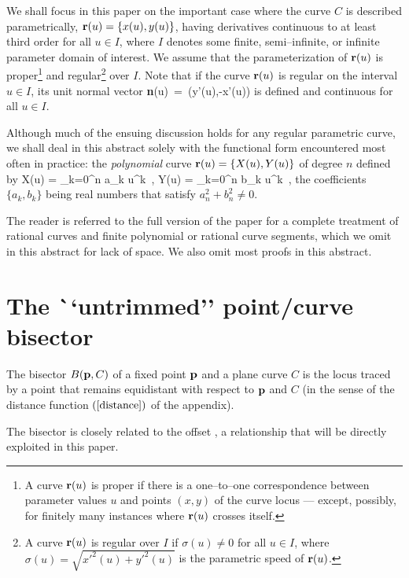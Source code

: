 We shall focus in this paper on the important case where the curve $C$
is described parametrically, ${\bf r}(u)=\{x(u),y(u)\}$, having
derivatives
continuous to at least third order for all $u \in I$, where $I$
denotes some finite, semi--infinite, or infinite parameter domain
of interest. We assume that the parameterization of ${\bf r}(u)$
is proper\footnote{A curve ${\bf r}(u)$ is proper if there 
is a one--to--one correspondence
between parameter values $u$ and points $(x,y)$ of the curve
locus --- except, possibly, for finitely many instances where
${\bf r}(u)$ crosses itself.}
and regular\footnote{A curve ${\bf r}(u)$ is regular over $I$ if
	$\sigma(u)\not=0$ for all $u \in I$, where 
	$\sigma(u) = \sqrt{x'^2(u)+y'^2(u)}$ is 
	the parametric speed of ${\bf r}(u)$.}
over $I$.
Note that if the curve ${\bf r}(u)$ is regular on the
interval $u \in I$, its unit normal vector
\be \label{normal}
{\bf n}(u) \,=\, {(y'(u),-x'(u)) \over {}}
\ee
is defined and continuous for all $u \in I$.

Although much of the ensuing discussion holds for any regular
parametric curve, we shall deal in this abstract solely with the functional
form encountered most often in practice: the {\it polynomial\/}
curve ${\bf r}(u)=\{X(u),Y(u)\}$ of degree $n$ defined by
\be \label{polycurve}
X(u) = \sum_{k=0}^n a_k u^k \,, \quad
Y(u) = \sum_{k=0}^n b_k u^k \,,
\ee
the coefficients $\{a_k,b_k\}$ being real numbers that satisfy
$a_n^2+b_n^2\not=0$.

The reader is referred to the full version of the paper \cite{faroukijj91} 
for a complete treatment of rational curves and finite polynomial
or rational curve segments, 
which we omit in this abstract for lack of space.
We also omit most proofs in this abstract.

\section{The {\mbox ``untrimmed'' point/curve} bisector}
\label{sec:untrim}

\begin{dfn} \label{defbsctr}
The bisector $B({\bf p},C)$ of a fixed point ${\bf p}$ and a plane curve $C$
is the locus traced by a point that remains equidistant with respect
to ${\bf p}$ and $C$ (in the sense of the distance function $(\ref{distance})$
of the appendix).
\end{dfn}

The bisector is closely related to the offset \cite{farouki90a,farouki90b}, 
a relationship that will be directly exploited in this paper.


